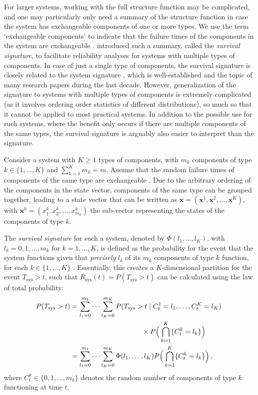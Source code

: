 \documentclass[12pt, a4paper]{elsarticle}
\newcommand{\bs}[1]{\boldsymbol{#1}}
\renewcommand{\vec}[1]{{\bs#1}}
\newcommand{\Rsys}{R_\text{sys}}
\def\Tsys{T_\text{sys}}
\begin{document}
For larger systems, working with the full structure function may be complicated, and one may particularly
only need a summary of the structure function in case the system has exchangeable components of one or more
types. We use the term `exchangeable components' to indicate that the failure times of the components in the system
are exchangeable \citep{DF74}. \citet{2012:survsign} introduced such a summary,
called the \emph{survival signature}, 
to facilitate reliability analyses for systems with multiple types of components. In case of just a single type of components, 
the survival signature is closely related to the system signature \citep{Sa07}, which is well-established and the topic of many
research papers during the last decade. However, generalization of the signature to systems with
multiple types of components is extremely complicated (as it involves ordering order statistics of different
distributions), so much so that it cannot be applied to most practical systems. In addition to the 
possible use for such systems, where the benefit only occurs if there are multiple components of the 
same types, the survival signature is arguably also easier to interpret than the signature. 

Consider a system with $K\ge 1$ types of components, with $m_k$ components of type $k \in \{1,\ldots,K\}$ and 
$\sum_{k=1}^K m_k = m$. Assume that the random failure times of components of the same type are exchangeable \citep{DF74}.
Due to the arbitrary ordering of the components in the state vector, components of the same type can be grouped together, 
leading to a state vector that can be written as 
$\vec{x} = (\vec{x}^1,\vec{x}^2,\ldots,\vec{x}^K)$, with 
$\vec{x}^k = (x^k_1,x^k_2,\ldots,x^k_{m_k})$ the sub-vector representing the states of the components of type $k$. 

The \emph{survival signature} for such a system, denoted by $\Phi(l_1,\ldots,l_K)$, with $l_k=0,1,\ldots,m_k$ 
for $k=1,\ldots,K$, is defined as the probability for the event that the system functions given that \emph{precisely} $l_k$ of its 
$m_k$ components of type $k$ function, for each $k\in \{1,\ldots,K\}$ \citep{2012:survsign}.
Essentially, this creates a $K$-dimensional partition for the event $\Tsys > t$, such that $\Rsys(t) = P(\Tsys > t)$
can be calculated using the law of total probability:
\begin{align}
\label{eq:rsyswithsurvsign}
P(\Tsys > t)
 &= \sum_{l_1=0}^{m_1} \cdots \sum_{l_K=0}^{m_K} P(\Tsys > t \mid C^1_t = l_1,\ldots, C^K_t = l_K) \nonumber\\
 &  \hspace*{24ex}                        \times P\Big( \bigcap_{k=1}^K \{ C^k_t = l_k\} \Big) \nonumber\\
 &= \sum_{l_1=0}^{m_1} \cdots \sum_{l_K=0}^{m_K} \Phi(l_1, \ldots, l_K)
                                                 P\Big( \bigcap_{k=1}^K \{ C^k_t = l_k\} \Big) \,,
\end{align}
where $C^k_t \in \{0, 1, \ldots, m_k\}$ denotes
the random number of components of type $k$ functioning at time $t$. 
\end{document}
